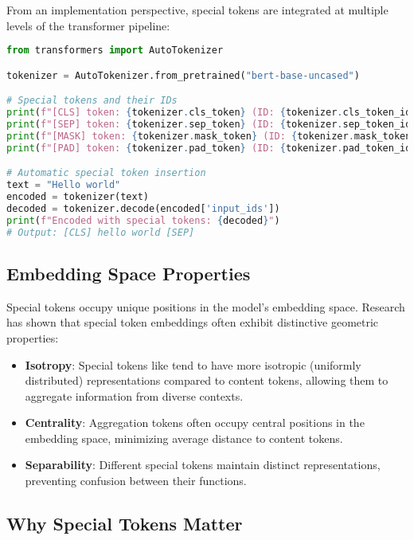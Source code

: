 From an implementation perspective, special tokens are integrated at multiple levels of the transformer pipeline:

\begin{example}
\begin{lstlisting}[language=Python]
from transformers import AutoTokenizer

tokenizer = AutoTokenizer.from_pretrained("bert-base-uncased")

# Special tokens and their IDs
print(f"[CLS] token: {tokenizer.cls_token} (ID: {tokenizer.cls_token_id})")
print(f"[SEP] token: {tokenizer.sep_token} (ID: {tokenizer.sep_token_id})")
print(f"[MASK] token: {tokenizer.mask_token} (ID: {tokenizer.mask_token_id})")
print(f"[PAD] token: {tokenizer.pad_token} (ID: {tokenizer.pad_token_id})")

# Automatic special token insertion
text = "Hello world"
encoded = tokenizer(text)
decoded = tokenizer.decode(encoded['input_ids'])
print(f"Encoded with special tokens: {decoded}")
# Output: [CLS] hello world [SEP]
\end{lstlisting}
\end{example}

\subsection{Embedding Space Properties}

Special tokens occupy unique positions in the model's embedding space. Research has shown that special token embeddings often exhibit distinctive geometric properties:

\begin{itemize}
\item \textbf{Isotropy}: Special tokens like \cls{} tend to have more isotropic (uniformly distributed) representations compared to content tokens, allowing them to aggregate information from diverse contexts.

\item \textbf{Centrality}: Aggregation tokens often occupy central positions in the embedding space, minimizing average distance to content tokens.

\item \textbf{Separability}: Different special tokens maintain distinct representations, preventing confusion between their functions.
\end{itemize}

\subsection{Why Special Tokens Matter}

